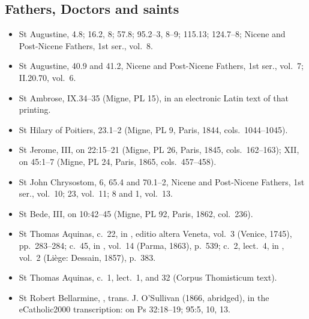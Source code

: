 {\subsection*{Fathers, Doctors and saints}
\begin{itemize}\setlength{\itemsep}{0.15em}\setlength{\parskip}{0pt}
\item St Augustine,  4.8; 16.2, 8; 57.8; 95.2--3, 8--9; 115.13; 124.7--8; Nicene and Post-Nicene Fathers, 1st ser., vol.~8.
\item St Augustine,  40.9 and 41.2, Nicene and Post-Nicene Fathers, 1st ser., vol.~7;  II.20.70, vol.~6.
\item St Ambrose,  IX.34--35 (Migne, PL 15), in an electronic Latin text of that printing.
\item St Hilary of Poitiers,  23.1--2 (Migne, PL 9, Paris, 1844, cols.~1044--1045).
\item St Jerome,  III, on 22:15--21 (Migne, PL 26, Paris, 1845, cols.~162--163);  XII, on 45:1--7 (Migne, PL 24, Paris, 1865, cols.~457--458).
\item St John Chrysostom,  6, 65.4 and 70.1--2, Nicene and Post-Nicene Fathers, 1st ser., vol.~10;  23, vol.~11;  8 and  1, vol.~13.
\item St Bede,  III, on 10:42--45 (Migne, PL 92, Paris, 1862, col.~236).
\item St Thomas Aquinas,  c.~22, in , editio altera Veneta, vol.~3 (Venice, 1745), pp.~283--284;  c.~45, in , vol.~14 (Parma, 1863), p.~539;  c.~2, lect.~4, in , vol.~2 (Li\`ege: Dessain, 1857), p.~383.
\item St Thomas Aquinas,  c.~1, lect.~1, and  32 (Corpus Thomisticum text).
\item St Robert Bellarmine, , trans. J. O'Sullivan (1866, abridged), in the eCatholic2000 transcription: on Ps 32:18--19; 95:5, 10, 13.
\end{itemize}

}
